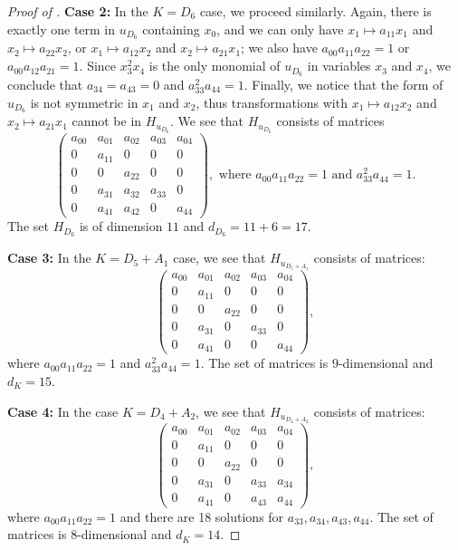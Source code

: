 \documentclass[10pt,a4paper]{amsart}
\begin{document}
\begin{proof}[Proof of ]
    \noindent \textbf{Case 2:} In the $K=D_6$ case, we proceed similarly. Again, there is exactly one term in $u_{D_6}$ containing $x_0$, and we can only have $x_1\mapsto a_{11}x_1$ and $x_2\mapsto a_{22}x_2$, or $x_1\mapsto a_{12}x_2$ and $x_2\mapsto a_{21}x_1$; we also have $a_{00}a_{11}a_{22}=1$ or $a_{00}a_{12}a_{21}=1$. Since $x_3^2x_4$ is the only monomial of $u_{D_6}$ in variables $x_3$ and $x_4$, we conclude that $a_{34}=a_{43}=0$ and $a_{33}^2a_{44}=1$. Finally, we notice that the form of $u_{D_6}$ is not symmetric in $x_1$ and $x_2$, thus transformations with $x_1\mapsto a_{12}x_2$ and $x_2\mapsto a_{21}x_1$ cannot be in $H_{u_{D_6}}$. We see that $H_{u_{D_6}}$ consists of matrices
    $$
    \begin{pmatrix}
        a_{00} & a_{01} & a_{02} & a_{03} & a_{04}\\
             0 & a_{11} &      0 &      0 &      0\\
             0 &      0 & a_{22} &      0 &      0\\
             0 & a_{31} & a_{32} & a_{33} &      0\\
             0 & a_{41} & a_{42} &      0 & a_{44}
    \end{pmatrix}, \text{ where } a_{00}a_{11}a_{22}=1 \text{ and } a_{33}^2a_{44}=1.
    $$
    The set $H_{D_6}$ is of dimension $11$ and $d_{D_6}=11+6=17$.

    \medskip

    \noindent\textbf{Case 3:} In the $K=D_5+A_1$ case, we see that $H_{u_{D_5+A_1}}$ consists of matrices:
$$
\begin{pmatrix}
        a_{00} & a_{01} & a_{02} & a_{03} & a_{04}\\
        0 & a_{11} &      0 &      0 &      0\\
        0 &      0 & a_{22} &      0 &      0\\
        0 & a_{31} &      0 & a_{33} &      0\\
        0 & a_{41} &      0 &      0 & a_{44}
\end{pmatrix}, 
$$
where $a_{00}a_{11}a_{22}=1$ and $a_{33}^2a_{44}=1.$
The set of matrices is $9$-dimensional and $d_K=15$. 

\medskip

\noindent\textbf{Case 4:} In the case $K=D_4+A_2$, we see that $H_{u_{D_4+A_2}}$ consists of matrices:
$$
\begin{pmatrix}
        a_{00} & a_{01} & a_{02} & a_{03} & a_{04}\\
        0 & a_{11} &      0 &      0 &      0\\
        0 &      0 & a_{22} &      0 &      0\\
        0 & a_{31} &      0 & a_{33} & a_{34}\\
        0 & a_{41} &      0 & a_{43} & a_{44}
\end{pmatrix},$$
where $a_{00}a_{11}a_{22}=1$ and there are 18 solutions for $a_{33},a_{34},a_{43},a_{44}$. The set of matrices is $8$-dimensional and $d_K=14$. 


\end{proof}
\end{document}

